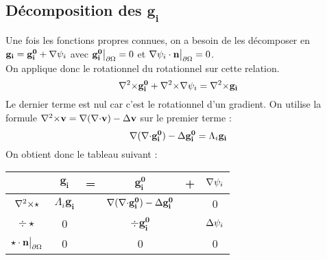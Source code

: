 \subsection{Décomposition des $\mathbf{g_i}$}
\label{decomp}

Une fois les fonctions propres connues, on a besoin de les décomposer en $\mathbf{g_i}=\mathbf{g_i^0}+{\nabla}\psi_i$ avec $\mathbf{g_i^0}{\big\rvert_{\partial\Omega}} = 0$ et ${\nabla}\psi_i\cdot \mathbf{n}{\big\rvert_{\partial\Omega}} = 0$.\\
On applique donc le rotationnel du rotationnel sur cette relation.\\
\[
{\nabla^2\times} \mathbf{g_i^0} +{\nabla^2\times}{\nabla}\psi_i = {\nabla^2\times} \mathbf{g_i}
\]
Le dernier terme est nul car c'est le rotationnel d'un gradient. On utilise la formule ${\nabla^2\times} \mathbf{v}={\nabla}({\nabla\cdot} \mathbf{v})-{\Delta} \mathbf{v}$ sur le premier terme :
\[
{\nabla}({\nabla\cdot} \mathbf{g_i^0})-{\Delta} \mathbf{g_i^0} = \Lambda_i \mathbf{g_i}
\]
On obtient donc le tableau suivant :
\begin{center}
\begin{tabular}{c|ccccc}
& $\mathbf{g_i}$ & = & $\mathbf{g_i^0}$ & + & ${\nabla}\psi_i$ \\ \hline
${\nabla^2\times}\star$ & $\Lambda_i\mathbf{g_i}$ & & ${\nabla}({\nabla\cdot} \mathbf{g_i^0})-{\Delta} \mathbf{g_i^0}$ & & 0\\ \hline
$\div\star$ & 0 & & $\div \mathbf{g_i^0}$ & & ${\Delta}\psi_i$\\ \hline
$\star\cdot \mathbf{n}{\big\rvert_{\partial\Omega}}$ & 0 & & 0 & & 0
\end{tabular}
\end{center}

